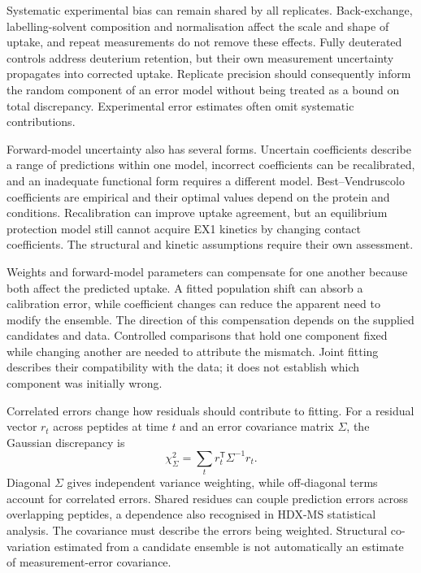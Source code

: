 Systematic experimental bias can remain shared by all replicates. Back-exchange, labelling-solvent composition and normalisation affect the scale and shape of uptake, and repeat measurements do not remove these effects. Fully deuterated controls address deuterium retention, but their own measurement uncertainty propagates into corrected uptake.\supercite{massonRecommendationsPerformingInterpreting2019} Replicate precision should consequently inform the random component of an error model without being treated as a bound on total discrepancy. Experimental error estimates often omit systematic contributions.\supercite{bonomiPrinciplesProteinStructural2017}

Forward-model uncertainty also has several forms. Uncertain coefficients describe a range of predictions within one model, incorrect coefficients can be recalibrated, and an inadequate functional form requires a different model.\supercite{bmsb2012ch12} Best--Vendruscolo coefficients are empirical and their optimal values depend on the protein and conditions.\supercite{bradshawInterpretationHDXData2020} Recalibration can improve uptake agreement, but an equilibrium protection model still cannot acquire EX1 kinetics by changing contact coefficients. The structural and kinetic assumptions require their own assessment.

Weights and forward-model parameters can compensate for one another because both affect the predicted uptake. A fitted population shift can absorb a calibration error, while coefficient changes can reduce the apparent need to modify the ensemble. The direction of this compensation depends on the supplied candidates and data. Controlled comparisons that hold one component fixed while changing another are needed to attribute the mismatch. Joint fitting describes their compatibility with the data; it does not establish which component was initially wrong.

Correlated errors change how residuals should contribute to fitting. For a residual vector $r_t$ across peptides at time $t$ and an error covariance matrix $\Sigma$, the Gaussian discrepancy is
\begin{equation}
    \chi^2_{\Sigma}=\sum_t r_t^{\mathsf T}\Sigma^{-1}r_t.
    \label{eq:bg-correlated-errors}
\end{equation}
Diagonal $\Sigma$ gives independent variance weighting, while off-diagonal terms account for correlated errors.\supercite{bmsb2012ch8} Shared residues can couple prediction errors across overlapping peptides, a dependence also recognised in HDX-MS statistical analysis.\supercite{crookEmpiricalBayesFunctional2022} The covariance must describe the errors being weighted. Structural co-variation estimated from a candidate ensemble is not automatically an estimate of measurement-error covariance.

